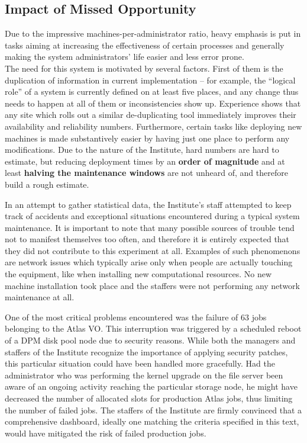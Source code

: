 \documentclass[12pt]{article}
\begin{document}
\subsection{Impact of Missed Opportunity}
Due to the impressive machines-per-administrator ratio, heavy emphasis is put in tasks aiming at increasing the effectiveness
of certain processes and generally making the system administrators' life easier and less error prone.\\
The need for this system is motivated by several factors.  First of them is the duplication of information in current
implementation -- for example, the ``logical role'' of a system is currently defined on at least five places, and any change thus
needs to happen at all of them or inconsistencies show up.  Experience shows that any site which rolls out a similar
de-duplicating tool immediately improves their availability and reliability numbers.  Furthermore, certain tasks like deploying
new machines is made substantively easier by having just one place to perform any modifications.  Due to the nature of the
Institute, hard numbers are hard to estimate, but reducing deployment times by an {\bf order of magnitude} and at least {\bf
halving the maintenance windows} are not unheard of, and therefore build a rough estimate.

In an attempt to gather statistical data, the Institute's staff attempted to keep track of accidents and exceptional situations
encountered during a typical system maintenance.  It is important to note that many possible sources of trouble tend not to
manifest themselves too often, and therefore it is entirely expected that they did not contribute to this experiment at all.
Examples of such phenomenons are network issues which typically arise only when people are actually touching the equipment, like
when installing new computational resources.  No new machine installation took place and the staffers were not performing any
network maintenance at all.

One of the most critical problems encountered was the failure of 63 jobs belonging to the Atlas VO.  This interruption was
triggered by a scheduled reboot of a DPM disk pool node due to security reasons.  While both the managers and staffers of the
Institute recognize the importance of applying security patches, this particular situation could have been handled more
gracefully.  Had the administrator who was performing the kernel upgrade on the file server been aware of an ongoing activity
reaching the particular storage node, he might have decreased the number of allocated slots for production Atlas jobs, thus
limiting the number of failed jobs.  The staffers of the Institute are firmly convinced that a comprehensive dashboard, ideally
one matching the criteria specified in this text, would have mitigated the risk of failed production jobs.
\end{document}

